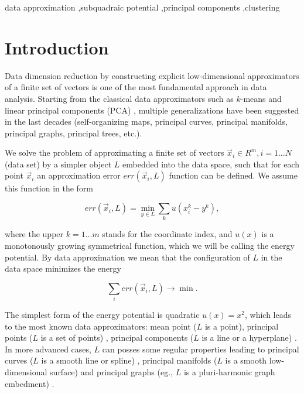 \documentclass[preprint,12pt]{elsarticle}
\begin{document}
\begin{frontmatter}
\begin{keyword}
data approximation \sep subquadraic potential \sep principal components \sep clustering


\end{keyword}

\end{frontmatter}


\section{Introduction}
\label{S:1}

Data dimension reduction by constructing explicit low-dimensional approximators of a finite set of vectors is one of the most fundamental approach in data analysis. Starting from the classical data approximators such as $k$-means and linear principal components (PCA) \cite{Pearson1901On}, multiple generalizations have been suggested in the last decades (self-organizing maps, principal curves, principal manifolds, principal graphs, principal trees, etc.)\cite{Gorban2009,Gorban2008Principal}.

We solve the problem of approximating a finite set of vectors ${\vec{x}_i}\in R^m,i=1...N$ (data set) by a simpler object $L$ embedded into the data space, such that for each point $\vec{x}_i$ an approximation error $err(\vec{x}_i,L)$ function can be defined. We assume this function in the form

\begin{equation}\label{distance_function}
err(\vec{x}_i,L) = \min_{y\in L} \sum_k u(x_i^k-y^k),
\end{equation}

\noindent where the upper $k=1...m$ stands for the coordinate index, and $u(x)$ is a monotonously growing symmetrical function, which we will be calling the energy potential. By data approximation we mean that the configuration of $L$ in the data space minimizes the energy

$$
\sum_i err(\vec{x}_i,L) \rightarrow \min.
$$

The simplest form of the energy potential is quadratic $u(x)=x^2$, which leads to the most known data approximators: mean point ($L$ is a point), principal points ($L$ is a set of points) \cite{Flury1990}, principal components ($L$ is a line or a hyperplane) \cite{Pearson1901On}. In more advanced cases, $L$ can posses some regular properties leading to principal curves ($L$ is a smooth line or spline) \cite{Hastie1984}, principal manifolds ($L$ is a smooth low-dimensional surface) and principal graphs (eg., $L$ is a pluri-harmonic graph embedment) \cite{gorban2007topological,Gorban2009}.
\end{document}
